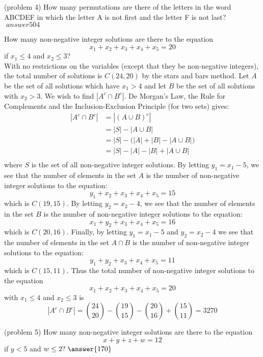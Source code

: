 \documentclass[handout]{ximera}
\begin{document}
\begin{problem}(problem 4)
How many permutations are there of the letters in the word ABCDEF in which the letter A is not 
first and the letter F is not last? $\; answer{504}$
\end{problem}


\begin{example}[example 5]
How many non-negative integer solutions are there to the equation
\[
x_1 + x_2 + x_3 + x_4 + x_5 = 20
\]
if $x_1 \leq 4$ and $x_2 \leq 3$?\\
With no restrictions on the variables (except that they be non-negative integers), 
the total number of solutions is $C(24, 20)$ by the stars and bars method.
Let $A$ be the set of all solutions which have $x_1 > 4$ and let $B$ be the set of all solutions with $x_2 > 3$.
We wish to find $|A^c \cap B^c|$.
De Morgan's Law, the Rule for Complements and the Inclusion-Exclusion Principle (for two sets) gives:
\begin{align*}
|A^c \cap B^c| &= |(A \cup B)^c|\\
               &= |S| - |A\cup B|\\
               &= |S| - \Big(|A| + |B| - |A\cup B|\Big)\\
               &= |S| - |A| - |B| + |A\cup B|\\
\end{align*}
where $S$ is the set of all non-negative integer solutions. By letting $y_1 = x_1 -5$, we see that 
the number of elements in the set $A$
is the number of non-negative integer solutions to the equation:
\[
y_1 + x_2 + x_3 + x_4 + x_5 = 15
\]
which is $C(19, 15)$. By letting $y_2 = x_2 -4$, we see that the number of elements in the set $B$
is the number of non-negative integer solutions to the equation:
\[
x_1 + y_2 + x_3 + x_4 + x_5 = 16
\]
which is $C(20, 16)$. Finally, by letting $y_1 = x_1 -5$ and $y_2 = x_2 -4$ we see that the number of 
elements in the set $A \cap B$
is the number of non-negative integer solutions to the equation:
\[
y_1 + y_2 + x_3 + x_4 + x_5 = 11
\]
which is $C(15, 11)$. 
Thus the total number of non-negative integer solutions to the equation
\[
x_1 + x_2 + x_3 + x_4 + x_5 = 20
\]
with $x_1 \leq 4$ and $x_2 \leq 3$ is
\[
|A^c \cap B^c| = \binom{24}{20} - \binom{19}{15} - \binom{20}{16} + \binom{15}{11} = 3270
\]

\end{example}


\begin{problem}(problem 5)
How many non-negative integer solutions are there to the equation
\[
x + y + z + w = 12
\]
if $y < 5$ and $w \leq 2 ? \; \answer{170}$

\end{problem}
\end{document}
